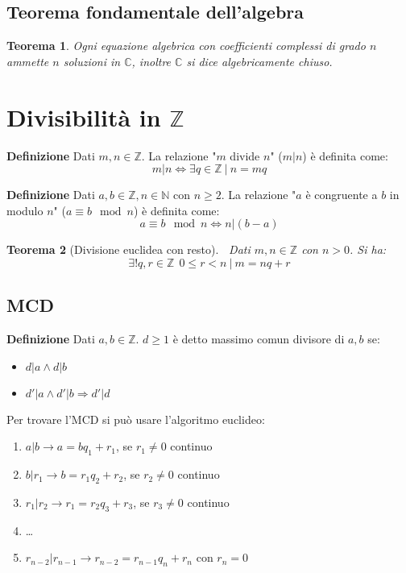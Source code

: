 \documentclass{article}
\newtheorem{theorem}{Teorema}
\begin{document}
\subsection{Teorema fondamentale dell'algebra}

\begin{theorem}
    Ogni equazione algebrica con coefficienti complessi di grado $n$ ammette $n$ soluzioni in $\mathbb{C}$, inoltre $\mathbb{C}$ si dice algebricamente chiuso.\newline
\end{theorem}

\section{Divisibilità in $\mathbb{Z}$}

\textbf{Definizione} Dati $m,n\in\mathbb{Z}$. La relazione "$m$ divide $n$" ($m|n$) è definita come:
$$m|n\iff\exists q\in\mathbb{Z}\ | \ n=mq$$\newline

\noindent\textbf{Definizione} Dati $a,b\in\mathbb{Z},n\in\mathbb{N}$ con $n\geq2$. La relazione "$a$ è congruente a $b$ in modulo $n$" ($a\equiv b\mod{n}$) è definita come:
$$a\equiv b\mod{n}\iff n|(b-a)$$\newline

\begin{theorem}[Divisione euclidea con resto]$\ $\newline
    Dati $m,n\in\mathbb{Z}$ con $n>0$. Si ha:
    $$\exists!q,r\in\mathbb{Z}\ \ 0\leq r<n\ |\ m=nq+r$$\newline
\end{theorem}

\subsection{MCD}

\noindent\textbf{Definizione} Dati $a,b\in\mathbb{Z}$. $d\geq1$ è detto massimo comun divisore di $a,b$ se:
\begin{itemize}
    \item $d|a\wedge d|b$
    \item $d'|a\wedge d'|b\Rightarrow d'|d$\newline
\end{itemize}

\noindent Per trovare l'MCD si può usare l'algoritmo euclideo:
\begin{enumerate}
    \item $a|b\rightarrow a=bq_1+r_1$, se $r_1\neq0$ continuo
    \item $b|r_1\rightarrow b=r_1q_2+r_2$, se $r_2\neq0$ continuo
    \item $r_1|r_2\rightarrow r_1=r_2q_3+r_3$, se $r_3\neq0$ continuo
    \item\ldots
    \item $r_{n-2}|r_{n-1}\rightarrow r_{n-2}=r_{n-1}q_n+r_n$ con $r_n=0$
\end{enumerate}
\end{document}
